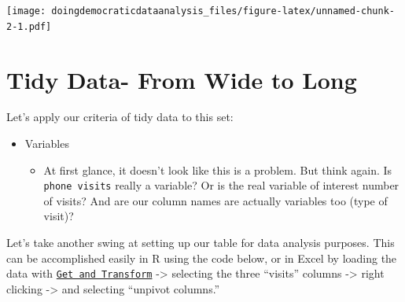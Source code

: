 \documentclass[
]{book}
\newenvironment{Shaded}{\begin{snugshade}}{\end{snugshade}}
\newcommand{\CommentTok}[1]{\textcolor[rgb]{0.56,0.35,0.01}{\textit{#1}}}
\newcommand{\DataTypeTok}[1]{\textcolor[rgb]{0.13,0.29,0.53}{#1}}
\newcommand{\KeywordTok}[1]{\textcolor[rgb]{0.13,0.29,0.53}{\textbf{#1}}}
\newcommand{\NormalTok}[1]{#1}
\newcommand{\OperatorTok}[1]{\textcolor[rgb]{0.81,0.36,0.00}{\textbf{#1}}}
\newcommand{\StringTok}[1]{\textcolor[rgb]{0.31,0.60,0.02}{#1}}
\providecommand{\tightlist}{%
  \setlength{\itemsep}{0pt}\setlength{\parskip}{0pt}}
\begin{document}
\texttt{[image: doingdemocraticdataanalysis\_files/figure-latex/unnamed-chunk-2-1.pdf]}

\hypertarget{tidy-data--from-wide-to-long}{%
\section{Tidy Data- From Wide to Long}\label{tidy-data--from-wide-to-long}}

Let's apply our criteria of tidy data to this set:

\begin{itemize}
\tightlist
\item
  Variables

  \begin{itemize}
  \tightlist
  \item
    At first glance, it doesn't look like this is a problem. But think again. Is \texttt{phone\ visits} really a variable? Or is the real variable of interest number of visits? And are our column names are actually variables too (type of visit)?
  \end{itemize}
\end{itemize}

Let's take another swing at setting up our table for data analysis purposes. This can be accomplished easily in R using the code below, or in Excel by loading the data with \href{https://support.microsoft.com/en-us/office/unpivot-columns-power-query-0f7bad4b-9ea1-49c1-9d95-f588221c7098}{\texttt{Get\ and\ Transform}} -\textgreater{} selecting the three ``visits'' columns -\textgreater{} right clicking -\textgreater{} and selecting ``unpivot columns.''

\begin{Shaded}
\end{Shaded}
\end{document}
